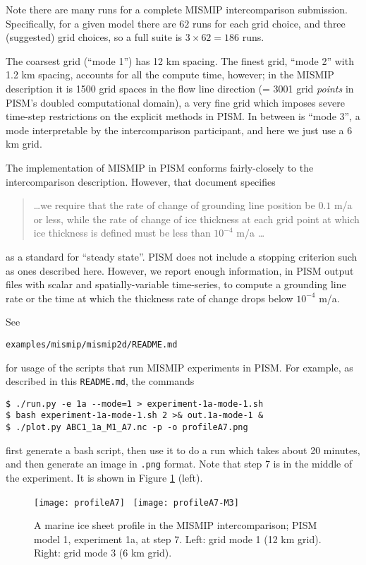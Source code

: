 Note there are many runs for a complete MISMIP intercomparison submission.  Specifically, for a given model there are $62$ runs for each grid choice, and three (suggested) grid choices, so a full suite is $3 \times 62 = 186$ runs.

The coarsest grid (``mode 1'') has 12 km spacing.  The finest grid, ``mode 2'' with 1.2 km spacing, accounts for all the compute time, however; in the MISMIP description it is 1500 grid spaces in the flow line direction (= 3001 grid \emph{points} in PISM's doubled computational domain), a very fine grid which imposes severe time-step restrictions on the explicit methods in PISM.  In between is ``mode 3'', a mode interpretable by the intercomparison participant, and here we just use a 6 km grid.

The implementation of MISMIP in PISM conforms fairly-closely to the intercomparison description.  However, that document specifies
\begin{quotation}
\dots we require that the rate of change of grounding line position be $0.1$ m/a or less, while the rate of change of ice thickness at each grid point at which ice thickness is defined must be less than $10^{-4}$ m/a \dots
\end{quotation}
as a standard for ``steady state''. PISM does not include a stopping criterion such as ones described here. However, we report enough information, in PISM output files with scalar and spatially-variable time-series, to compute a grounding line rate or the time at which the thickness rate of change drops below $10^{-4}$ m/a.

See

  \centerline{\texttt{examples/mismip/mismip2d/README.md}}

\noindent for usage of the scripts that run MISMIP experiments in PISM.  For example, as described in this \texttt{README.md}, the commands

\begin{verbatim}
$ ./run.py -e 1a --mode=1 > experiment-1a-mode-1.sh
$ bash experiment-1a-mode-1.sh 2 >& out.1a-mode-1 &
$ ./plot.py ABC1_1a_M1_A7.nc -p -o profileA7.png
\end{verbatim}

\noindent first generate a bash script, then use it to do a run which takes about 20 minutes, and then generate an image in \texttt{.png} format.  Note that step 7 is in the middle of the experiment.  It is shown in Figure \ref{fig:MISMIPmodel1exper1aA7} (left).
 
\begin{figure}[ht]
\centering
\texttt{[image: profileA7]} \,
\texttt{[image: profileA7-M3]}
\caption{A marine ice sheet profile in the MISMIP intercomparison; PISM model 1, experiment 1a, at step 7.  Left: grid mode 1 (12 km grid).  Right: grid mode 3 (6 km grid).}
\label{fig:MISMIPmodel1exper1aA7}
\end{figure}

